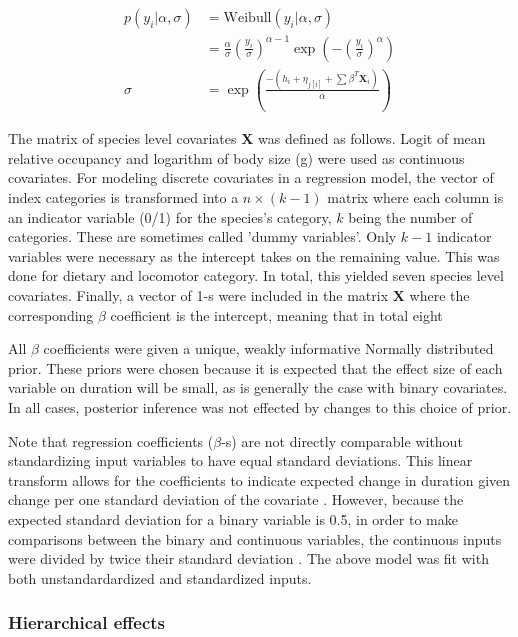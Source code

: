 \documentclass[12pt,letterpaper]{article}
\begin{document}
\begin{align}
  p(y_{i}|\alpha, \sigma) &= \mathrm{Weibull}(y_{i}|\alpha, \sigma) \nonumber \\ 
  &= \frac{\alpha}{\sigma} \left(\frac{y_{i}}{\sigma}\right)^{\alpha - 1} \exp\left(-\left(\frac{y_{i}}{\sigma}\right)^{\alpha}\right) \label{eq:weibull}\\
  \sigma &= \exp\left(\frac{-(h_{i} + \eta_{j[i]} + \sum \beta^{T} \mathbf{X}_{i})}{\alpha}\right) \label{eq:reg}
\end{align}

The matrix of species level covariates \(\mathbf{X}\) was defined as follows. Logit of mean relative occupancy and logarithm of body size (g) were used as continuous covariates. For modeling discrete covariates in a regression model, the vector of index categories is transformed into a \(n \times (k - 1)\) matrix where each column is an indicator variable (0/1) for the species's category, \(k\) being the number of categories. These are sometimes called 'dummy variables'. Only \(k - 1\) indicator variables were necessary as the intercept takes on the remaining value. This was done for dietary and locomotor category. In total, this yielded seven species level covariates. Finally, a vector of 1-s were included in the matrix \(\mathbf{X}\) where the corresponding \(\beta\) coefficient is the intercept, meaning that in total eight 

All \(\beta\) coefficients were given a unique, weakly informative Normally distributed prior. These priors were chosen because it is expected that the effect size of each variable on duration will be small, as is generally the case with binary covariates. In all cases, posterior inference was not effected by changes to this choice of prior. %

Note that regression coefficients (\(\beta\)-s) are not directly comparable without standardizing input variables to have equal standard deviations. This linear transform allows for the coefficients to indicate expected change in duration given change per one standard deviation of the covariate \citep{Schielzeth2010}. However, because the expected standard deviation for a binary variable is 0.5, in order to make comparisons between the binary and continuous variables, the continuous inputs were divided by twice their standard deviation \citep{Gelman2008}. The above model was fit with both unstandardardized and standardized inputs.


\subsubsection{Hierarchical effects}
\end{document}

